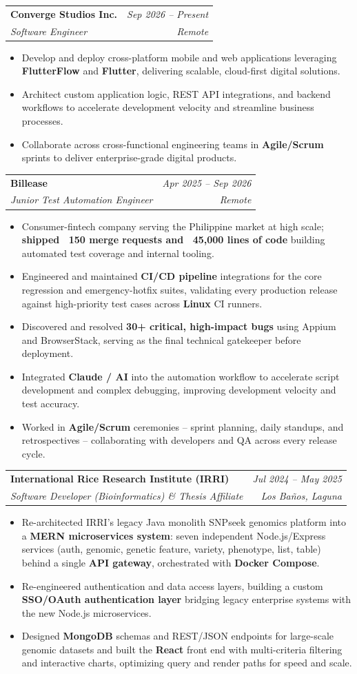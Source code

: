 \documentclass[11pt,a4paper]{article}
\makeatletter
\newcommand{\entry}[4]{%
  \par\smallskip
  \noindent\begin{tabular*}{\linewidth}{@{\extracolsep{\fill}}l r@{}}
    \textbf{#1} & {\small\itshape\color{muted}#3} \\[-2pt]
    {\small\itshape\color{muted}#2} & {\small\itshape\color{muted}#4} \\
  \end{tabular*}\par\vspace{-2pt}
}
\makeatother
\begin{document}
\entry{Converge Studios Inc.}{Software Engineer}{Sep 2026 -- Present}{Remote}
\begin{itemize}
  \item Develop and deploy cross-platform mobile and web applications leveraging \textbf{FlutterFlow} and \textbf{Flutter}, delivering scalable, cloud-first digital solutions.
  \item Architect custom application logic, REST API integrations, and backend workflows to accelerate development velocity and streamline business processes.
  \item Collaborate across cross-functional engineering teams in \textbf{Agile/Scrum} sprints to deliver enterprise-grade digital products.
\end{itemize}

\entry{Billease}{Junior Test Automation Engineer}{Apr 2025 -- Sep 2026}{Remote}
\begin{itemize}
  \item Consumer-fintech company serving the Philippine market at high scale; \textbf{shipped ~150 merge requests and ~45{,}000 lines of code} building automated test coverage and internal tooling.
  \item Engineered and maintained \textbf{CI/CD pipeline} integrations for the core regression and emergency-hotfix suites, validating every production release against high-priority test cases across \textbf{Linux} CI runners.
  \item Discovered and resolved \textbf{30+ critical, high-impact bugs} using Appium and BrowserStack, serving as the final technical gatekeeper before deployment.
  \item Integrated \textbf{Claude / AI} into the automation workflow to accelerate script development and complex debugging, improving development velocity and test accuracy.
  \item Worked in \textbf{Agile/Scrum} ceremonies -- sprint planning, daily standups, and retrospectives -- collaborating with developers and QA across every release cycle.
\end{itemize}

\entry{International Rice Research Institute (IRRI)}{Software Developer (Bioinformatics) \& Thesis Affiliate}{Jul 2024 -- May 2025}{Los Ba\~nos, Laguna}
\begin{itemize}
  \item Re-architected IRRI's legacy Java monolith SNPseek genomics platform into a \textbf{MERN microservices system}: seven independent Node.js/Express services (auth, genomic, genetic feature, variety, phenotype, list, table) behind a single \textbf{API gateway}, orchestrated with \textbf{Docker Compose}.
  \item Re-engineered authentication and data access layers, building a custom \textbf{SSO/OAuth authentication layer} bridging legacy enterprise systems with the new Node.js microservices.
  \item Designed \textbf{MongoDB} schemas and REST/JSON endpoints for large-scale genomic datasets and built the \textbf{React} front end with multi-criteria filtering and interactive charts, optimizing query and render paths for speed and scale.
\end{itemize}
\end{document}
